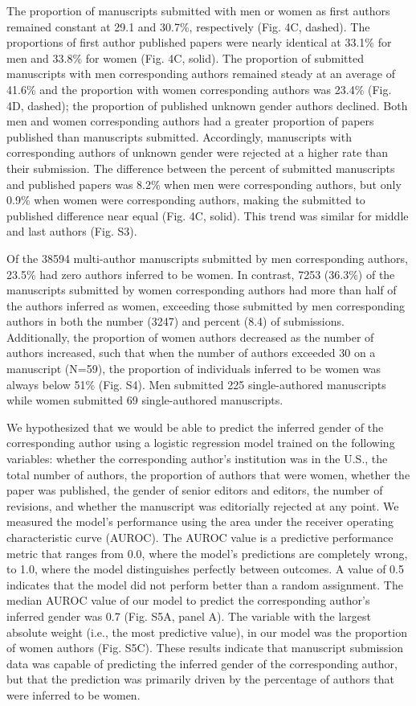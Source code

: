 \documentclass[11pt,]{article}
\begin{document}
The proportion of manuscripts submitted with men or women as first
authors remained constant at 29.1 and 30.7\%, respectively (Fig. 4C,
dashed). The proportions of first author published papers were nearly
identical at 33.1\% for men and 33.8\% for women (Fig. 4C, solid). The
proportion of submitted manuscripts with men corresponding authors
remained steady at an average of 41.6\% and the proportion with women
corresponding authors was 23.4\% (Fig. 4D, dashed); the proportion of
published unknown gender authors declined. Both men and women
corresponding authors had a greater proportion of papers published than
manuscripts submitted. Accordingly, manuscripts with corresponding
authors of unknown gender were rejected at a higher rate than their
submission. The difference between the percent of submitted manuscripts
and published papers was 8.2\% when men were corresponding authors, but
only 0.9\% when women were corresponding authors, making the submitted
to published difference near equal (Fig. 4C, solid). This trend was
similar for middle and last authors (Fig. S3).

Of the 38594 multi-author manuscripts submitted by men corresponding
authors, 23.5\% had zero authors inferred to be women. In contrast, 7253
(36.3\%) of the manuscripts submitted by women corresponding authors had
more than half of the authors inferred as women, exceeding those
submitted by men corresponding authors in both the number (3247) and
percent (8.4) of submissions. Additionally, the proportion of women
authors decreased as the number of authors increased, such that when the
number of authors exceeded 30 on a manuscript (N=59), the proportion of
individuals inferred to be women was always below 51\% (Fig. S4). Men
submitted 225 single-authored manuscripts while women submitted 69
single-authored manuscripts.

We hypothesized that we would be able to predict the inferred gender of
the corresponding author using a logistic regression model trained on
the following variables: whether the corresponding author's institution
was in the U.S., the total number of authors, the proportion of authors
that were women, whether the paper was published, the gender of senior
editors and editors, the number of revisions, and whether the manuscript
was editorially rejected at any point. We measured the model's
performance using the area under the receiver operating characteristic
curve (AUROC). The AUROC value is a predictive performance metric that
ranges from 0.0, where the model's predictions are completely wrong, to
1.0, where the model distinguishes perfectly between outcomes. A value
of 0.5 indicates that the model did not perform better than a random
assignment. The median AUROC value of our model to predict the
corresponding author's inferred gender was 0.7 (Fig. S5A, panel A). The
variable with the largest absolute weight (i.e., the most predictive
value), in our model was the proportion of women authors (Fig. S5C).
These results indicate that manuscript submission data was capable of
predicting the inferred gender of the corresponding author, but that the
prediction was primarily driven by the percentage of authors that were
inferred to be women.
\end{document}
